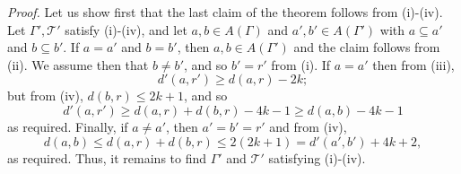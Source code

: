 \textit{Proof.} Let us show first that the last claim of the theorem follows from (i)-(iv). Let $\Gamma', \mathscr{T}'$ satisfy (i)-(iv), and let $a, b \in A(\Gamma)$ and $a', b' \in A(\Gamma')$ with $a \subseteq a'$ and $b \subseteq b'$. If $a = a'$ and $b = b'$, then $a, b \in A(\Gamma')$ and the claim follows from (ii). We assume then that $b \ne b'$, and so $b' = r'$ from (i). If $a = a'$ then from (iii),
\begin{equation*}
d'(a, r') \ge d(a, r) - 2k;
\end{equation*}
but from (iv), $d(b, r) \le 2k + 1$, and so
\begin{equation*}
d'(a, r') \ge d(a, r) + d(b, r) - 4k - 1 \ge d(a, b) - 4k - 1
\end{equation*}
as required. Finally, if $a \ne a'$, then $a' = b' = r'$ and from (iv),
\begin{equation*}
d(a, b) \le d(a, r) + d(b, r) \le 2(2k + 1) = d'(a', b') + 4k + 2,
\end{equation*}
as required. Thus, it remains to find $\Gamma'$ and $\mathscr{T}'$ satisfying (i)-(iv).
